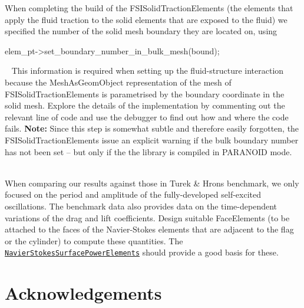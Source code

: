 \begin{DoxyItemize}
\item When completing the build of the {\ttfamily F\+S\+I\+Solid\+Traction\+Elements} (the elements that apply the fluid traction to the solid elements that are exposed to the fluid) we specified the number of the solid mesh boundary they are located on, using ~\newline
~\newline

\begin{DoxyCode}
elem\_pt->set\_boundary\_number\_in\_bulk\_mesh(bound);
\end{DoxyCode}
 ~\newline
 This information is required when setting up the fluid-\/structure interaction because the {\ttfamily Mesh\+As\+Geom\+Object} representation of the mesh of {\ttfamily F\+S\+I\+Solid\+Traction\+Elements} is parametrised by the boundary coordinate in the solid mesh. Explore the details of the implementation by commenting out the relevant line of code and use the debugger to find out how and where the code fails. {\bfseries Note\+:} Since this step is somewhat subtle and therefore easily forgotten, the {\ttfamily F\+S\+I\+Solid\+Traction\+Elements} issue an explicit warning if the bulk boundary number has not been set -- but only if the the library is compiled in P\+A\+R\+A\+N\+O\+ID mode. ~\newline
~\newline

\item When comparing our results against those in Turek \& Hron\textquotesingle{}s benchmark, we only focused on the period and amplitude of the fully-\/developed self-\/excited oscillations. The benchmark data also provides data on the time-\/dependent variations of the drag and lift coefficients. Design suitable {\ttfamily Face\+Elements} (to be attached to the faces of the Navier-\/\+Stokes elements that are adjacent to the flag or the cylinder) to compute these quantities. The \href{../../../the_data_structure/html/classoomph_1_1NavierStokesSurfacePowerElement.html}{\tt {\ttfamily Navier\+Stokes\+Surface\+Power\+Elements}} should provide a good basis for these.
\end{DoxyItemize}



 

\hypertarget{index_ackn}{}\section{Acknowledgements}\label{index_ackn}

